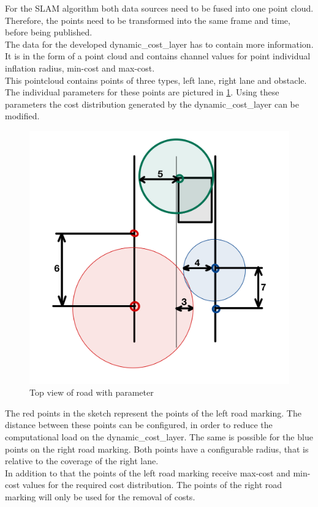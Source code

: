 For the SLAM algorithm both data sources need to be fused into one point cloud. Therefore, the points need to be transformed into the same frame and time, before being published.\\

The data for the developed dynamic\_cost\_layer has to contain more information. It is in the form of a point cloud and contains channel values for point individual inflation radius, min-cost and max-cost.\\ 

This pointcloud contains points of three types, left lane, right lane and obstacle.
The individual parameters for these points are pictured in \ref{markparams}. Using these parameters the cost distribution generated by the dynamic\_cost\_layer can be modified.\\

\begin{figure}[H]
	\centering
	\includegraphics[width=.7\textwidth]{Pictures/markfreespace parameter erklaerung}
	\caption{Top view of road with parameter}
	\label{markparams}
\end{figure}

The red points in the sketch represent the points of the left road marking. The distance between these points can be configured, in order to reduce the computational load on the dynamic\_cost\_layer. The same is possible for the blue points on the right road marking. Both points have a configurable radius, that is relative to the coverage of the right lane.\\
In addition to that the points of the left road marking receive max-cost and min-cost values for the required cost distribution. The points of the right road marking will only be used for the removal of costs.\\

